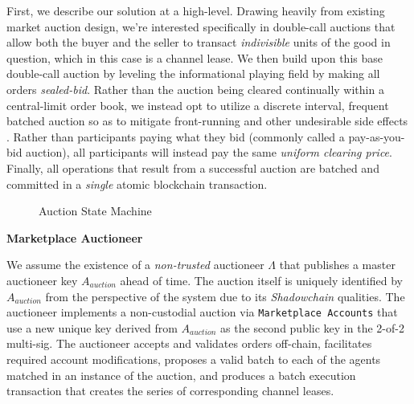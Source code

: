 \documentclass[10pt,a4paper]{article}
\theoremstyle{definition}
\begin{document}
First, we describe our solution at a high-level. Drawing heavily from existing
market auction design, we're interested specifically in double-call auctions
that allow both the buyer and the seller to transact \emph{indivisible} units
of the good in question, which in this case is a channel lease. We then build
upon this base double-call auction by leveling the informational playing field
\cite{milgromSealedBid} by making all orders \emph{sealed-bid}. Rather than the
auction being cleared continually within a central-limit order book, we instead
opt to utilize a discrete interval, frequent batched auction so as to mitigate
front-running and other undesirable side effects \cite{hftBatch}. Rather than
participants paying what they bid (commonly called a pay-as-you-bid auction),
all participants will instead pay the same \emph{uniform clearing price}.
Finally, all operations that result from a successful auction are batched and
committed in a \emph{single} atomic blockchain transaction.

\clearpage

\begin{figure}[!htb]


\caption{Auction State Machine}

\end{figure}


\begin{center}
    \textbf{Marketplace Auctioneer}
\end{center}

We assume the existence of a \emph{non-trusted} auctioneer $\Lambda$ that
publishes a master auctioneer key $A_{auction}$ ahead of time. The auction
itself is uniquely identified by $A_{auction}$ from the perspective of the
system due to its \emph{Shadowchain} qualities. The auctioneer implements a
non-custodial auction via \texttt{Marketplace Accounts} that use a new unique
key derived from $A_{auction}$ as the second public key in the 2-of-2
multi-sig. The auctioneer accepts and validates orders off-chain, facilitates
required account modifications, proposes a valid batch to each of the agents
matched in an instance of the auction, and produces a batch execution
transaction that creates the series of corresponding channel leases.
\end{document}
